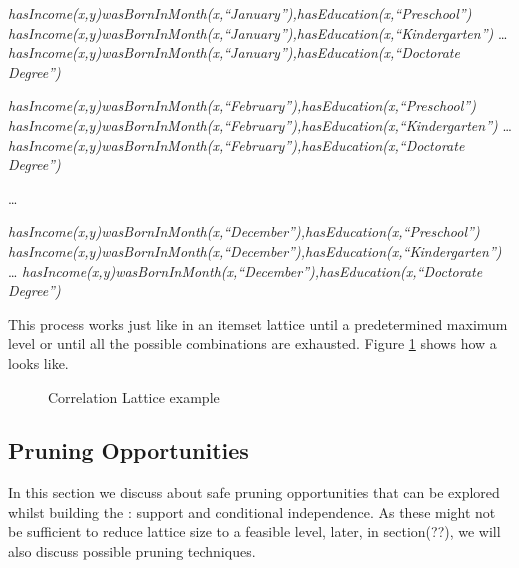  \emph{hasIncome(x,y)wasBornInMonth(x,``January''),hasEducation(x,``Preschool'')} \newline
  \emph{hasIncome(x,y)wasBornInMonth(x,``January''),hasEducation(x,``Kindergarten'')} \newline
  \dots \newline
  \emph{hasIncome(x,y)wasBornInMonth(x,``January''),hasEducation(x,``Doctorate Degree'')} \newline

  \emph{hasIncome(x,y)wasBornInMonth(x,``February''),hasEducation(x,``Preschool'')} \newline
  \emph{hasIncome(x,y)wasBornInMonth(x,``February''),hasEducation(x,``Kindergarten'')} \newline
  \dots \newline
  \emph{hasIncome(x,y)wasBornInMonth(x,``February''),hasEducation(x,``Doctorate Degree'')} \newline
 
  \dots \newline

  \emph{hasIncome(x,y)wasBornInMonth(x,``December''),hasEducation(x,``Preschool'')} \newline
  \emph{hasIncome(x,y)wasBornInMonth(x,``December''),hasEducation(x,``Kindergarten'')} \newline
  \dots \newline
  \emph{hasIncome(x,y)wasBornInMonth(x,``December''),hasEducation(x,``Doctorate Degree'')} \newline

This process works just like in an itemset lattice until a predetermined maximum level or until all the
possible combinations are exhausted. Figure \ref{fig:lattice} shows how a \graphname looks like.

\begin{figure}[!h]
  \caption{Correlation Lattice example}
  \centering
  \begin{tikzpicture}
  [scale=1.8,auto=center,every node/.style={circle,fill=black!10,minimum size=1.2cm, font=\tiny}]
  
  \end{tikzpicture}
  \label{fig:lattice}
\end{figure}

\subsection{Pruning Opportunities}

In this section we discuss about safe pruning opportunities that can be explored whilst building the \graphname: support
and conditional independence. As these might not be sufficient to reduce lattice size to a feasible level, later, in
section(??), we will also discuss possible pruning techniques.

